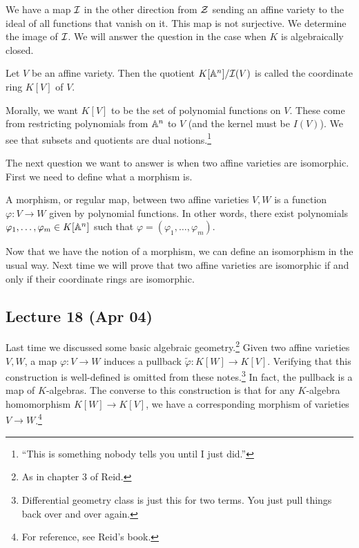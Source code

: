 \documentclass[10pt, twoside]{article}
\begin{document}
        We have a map $\mathcal{I}$ in the other direction from $\mathcal{Z}$ sending an
        affine variety to the ideal of all functions that vanish on it. This
        map is not surjective. We determine the image of $\mathcal{I}$. We will
        answer the question in the case when $K$ is algebraically closed.

        \begin{defn} Let $V$ be an affine variety. Then the quotient
        $K[\mathbb{A}^n]/\mathcal{I}(V)$ is called the coordinate ring $K[V]$ of $V$.
    \end{defn}

        Morally, we want $K[V]$ to be the set of polynomial functions on $V$.
        These come from restricting polynomials from $\mathbb{A}^n$ to $V$ (and the
        kernel must be $I(V)$). We see that subsets and quotients are dual
        notions.\footnote{``This is something nobody tells you until I just
        did.''}

        The next question we want to answer is when two affine varieties are
        isomorphic. First we need to define what a morphism is.

        \begin{defn} A morphism, or regular map, between two affine varieties
            $V,W$ is a function $\varphi:V \to W$ given by polynomial
            functions. In other words, there exist polynomials $\varphi_1,
            \ldots, \varphi_m \in K[\mathbb{A}^n]$ such that $\varphi = (\varphi_1,
            \ldots, \varphi_m)$.  \end{defn}

        Now that we have the notion of a morphism, we can define an isomorphism
        in the usual way. Next time we will prove that two affine varieties are
        isomorphic if and only if their coordinate rings are isomorphic.
        
        \subsection{Lecture 18 (Apr 04)} Last time we discussed some basic
        algebraic geometry.\footnote{As in chapter 3 of Reid.} Given two affine
        varieties $V,W$, a map $\varphi:V\to W$ induces a pullback
        $\widetilde{\varphi}:K[W]\to K[V]$. Verifying that this construction is
        well-defined is omitted from these notes.\footnote{Differential
        geometry class is just this for two terms. You just pull things back
    over and over again.} In fact, the pullback is a map of $K$-algebras. The
    converse to this construction is that for any $K$-algebra homomorphism
    $K[W] \to K[V]$, we have a corresponding morphism of varieties $V \to
    W$.\footnote{For reference, see Reid's book.}
\end{document}
